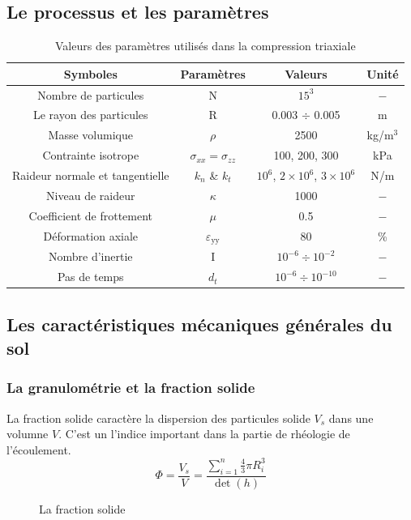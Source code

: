 \documentclass[a4paper,12pt]{report}
\begin{document}
\subsection{Le processus et les paramètres}

\begin{table}
\centering
\begin{tabular}{|c|c|c|c|}
\hline
\textbf{Symboles} & \textbf{Paramètres} & \textbf{Valeurs} & \textbf{Unité} \\ 
\hline
Nombre de particules & N & $15^3$ & $-$ \\  
\hline
Le rayon des particules & R & 0.003 $\div$ 0.005 & m \\  
\hline
Masse volumique & $\rho$  & 2500 & kg/m$^3$ \\
\hline
Contrainte isotrope & $\sigma_{xx} = \sigma_{zz}$ & 100, 200, 300 & kPa \\ 
\hline
Raideur normale et tangentielle & $k_n$ \& $k_t$ & $10^6$, $2 \times 10^6$, $3 \times 10^6$ & N/m \\ 
\hline
Niveau de raideur & $\kappa$ & 1000 & $-$ \\ 
\hline
Coefficient de frottement & $\mu$ & 0.5 & $-$ \\ 
\hline
Déformation axiale & $\varepsilon_{\text{yy}}$ &  80 & \% \\ 
\hline
Nombre d’inertie & I & $10^{-6} \div 10^{-2}$ & $-$ \\ 
\hline
Pas de temps & $d_t$  & $10^{-6} \div 10^{-10}$ & $-$\\
\hline
\end{tabular}
\caption{Valeurs des paramètres utilisés dans la compression triaxiale}
\label{tab:parametre}
\end{table}

\subsection{Les caractéristiques mécaniques générales du sol}
\subsubsection{La granulométrie et la fraction solide}
La fraction solide caractère la dispersion des particules solide $V_s$ dans une volumne $V$. 
C'est un l'indice important dans la partie de rhéologie de l'écoulement.
\begin{equation}
\Phi = \dfrac{V_s}{V} = \dfrac{\sum\limits_{i = 1}^n \frac{4}{3}\pi R_i^3}{\det(h)}
\end{equation}
                                \begin{figure}
                                   \centering \small 
                                    \caption{La fraction solide}
                                    \label{fig:fractionSolideMax}
                                \end{figure}
\end{document}
